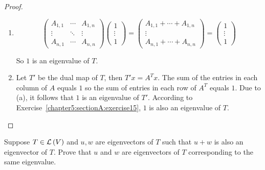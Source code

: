 \begin{proof}
    \begin{enumerate}[label={(\alph*)}]
        \item \[
                  \begin{pmatrix}
                      A_{1,1} & \cdots & A_{1,n} \\
                      \vdots  & \ddots & \vdots  \\
                      A_{n,1} & \cdots & A_{n,n}
                  \end{pmatrix}
                  \begin{pmatrix}
                      1      \\
                      \vdots \\
                      1
                  \end{pmatrix}
                  = \begin{pmatrix}
                      A_{1,1} + \cdots + A_{1,n} \\
                      \vdots                     \\
                      A_{n,1} + \cdots + A_{n,n}
                  \end{pmatrix}
                  = \begin{pmatrix}
                      1      \\
                      \vdots \\
                      1
                  \end{pmatrix}
              \]

              So $1$ is an eigenvalue of $T$.
        \item Let $T'$ be the dual map of $T$, then $T'x = A^{T}x$. The sum of the entries in each column of $A$ equals $1$ so the sum of entries in each row of $A^{T}$ equals $1$. Due to (a), it follows that $1$ is an eigenvalue of $T'$. According to Exercise~\ref{chapter5:sectionA:exercise15}, $1$ is also an eigenvalue of $T$.
    \end{enumerate}
\end{proof}
\newpage

\begin{exercise}\label{chapter5:sectionA:exercise25}
    Suppose $T \in \mathcal{L}\left({V}\right)$ and $u, w$ are eigenvectors of $T$ such that $u + w$ is also an eigenvector of $T$. Prove that $u$ and $w$ are eigenvectors of $T$ corresponding to the same eigenvalue.
\end{exercise}

